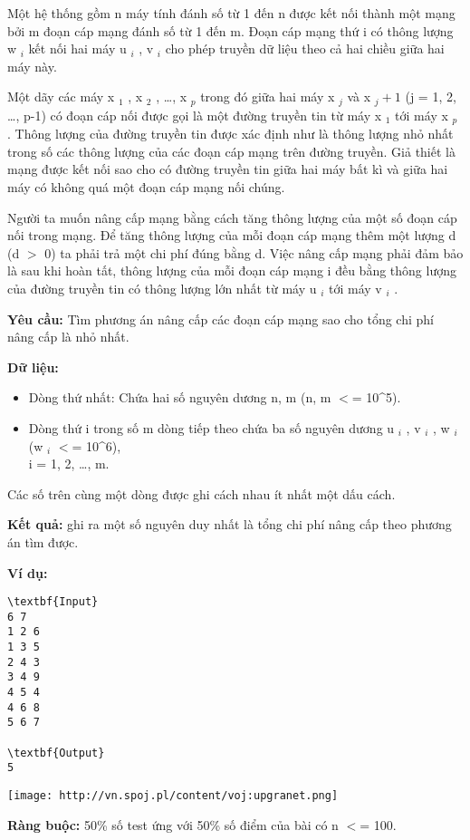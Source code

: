 

Một hệ thống gồm n máy tính đánh số từ 1 đến n được kết nối thành một mạng bởi m đoạn cáp mạng đánh số từ 1 đến m. Đoạn cáp mạng thứ i có thông lượng w $_ i $ kết nối hai máy u $_ i $ , v $_ i $ cho phép truyền dữ liệu theo cả hai chiều giữa hai máy này.

Một dãy các máy x $_ 1 $ , x $_ 2 $ , …, x $_ p $ trong đó giữa hai máy x $_ j $ và x $_ j+1 $ (j = 1, 2, …, p-1) có đoạn cáp nối được gọi là một đường truyền tin từ máy x $_ 1 $ tới máy x $_ p $ . Thông lượng của đường truyền tin được xác định như là thông lượng nhỏ nhất trong số các thông lượng của các đoạn cáp mạng trên đường truyền. Giả thiết là mạng được kết nối sao cho có đường truyền tin giữa hai máy bất kì và giữa hai máy có không quá một đoạn cáp mạng nối chúng.

Người ta muốn nâng cấp mạng bằng cách tăng thông lượng của một số đoạn cáp nối trong mạng. Để tăng thông lượng của mỗi đoạn cáp mạng thêm một lượng d (d $>$ 0) ta phải trả một chi phí đúng bằng d. Việc nâng cấp mạng phải đảm bảo là sau khi hoàn tất, thông lượng của mỗi đoạn cáp mạng i đều bằng thông lượng của đường truyền tin có thông lượng lớn nhất từ máy u $_ i $ tới máy v $_ i $ .

\textbf{Yêu cầu: } Tìm phương án nâng cấp các đoạn cáp mạng sao cho tổng chi phí nâng cấp là nhỏ nhất.

\textbf{Dữ liệu: }
\begin{itemize}
	\item Dòng thứ nhất: Chứa hai số nguyên dương n, m (n, m $<$= 10\textasciicircum5).
\end{itemize}
\begin{itemize}
	\item Dòng thứ i trong số m dòng tiếp theo chứa ba số nguyên dương u $_ i $ , v $_ i $ , w $_ i $ (w $_ i $ $<$= 10\textasciicircum6),
\\i = 1, 2, …, m.
\end{itemize}

Các số trên cùng một dòng được ghi cách nhau ít nhất một dấu cách.

\textbf{Kết quả: } ghi ra một số nguyên duy nhất là tổng chi phí nâng cấp theo phương án tìm được.

\textbf{Ví dụ: }\textbf{}
\begin{verbatim}
\textbf{Input}
6 7
1 2 6
1 3 5
2 4 3
3 4 9
4 5 4
4 6 8
5 6 7

\textbf{Output}
5\end{verbatim}


\texttt{[image: http://vn.spoj.pl/content/voj:upgranet.png]}

\textbf{Ràng buộc: } 50\% số test ứng với 50\% số điểm của bài có n $<$= 100.